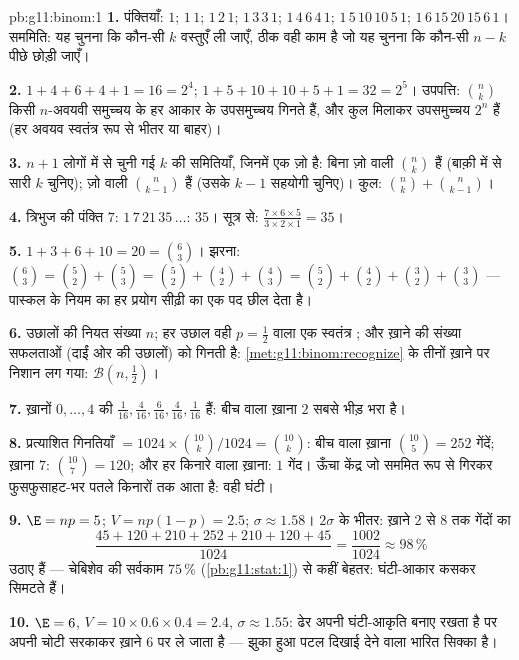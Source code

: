 \begin{solution}{pb:g11:binom:1}
\textbf{1.} पंक्तियाँ: $1$; $1\,1$; $1\,2\,1$; $1\,3\,3\,1$; $1\,4\,6\,4\,1$; $1\,5\,10\,10\,5\,1$; $1\,6\,15\,20\,15\,6\,1$। सममिति: यह
चुनना कि कौन-सी $k$ वस्तुएँ ली जाएँ, ठीक वही काम है जो यह चुनना कि कौन-सी
$n - k$ पीछे छोड़ी जाएँ।

\textbf{2.} $1 + 4 + 6 + 4 + 1 = 16 = 2^4$; $1 + 5 + 10 + 10 + 5 + 1 = 32 = 2^5$। उपपत्ति: $\binom nk$ किसी $n$-अवयवी समुच्चय के हर आकार के
उपसमुच्चय गिनते हैं, और कुल मिलाकर उपसमुच्चय $2^n$ हैं (हर अवयव स्वतंत्र रूप
से भीतर या बाहर)।

\textbf{3.} $n + 1$ लोगों में से चुनी गई $k$ की समितियाँ, जिनमें एक ज़ो है: बिना
ज़ो वाली $\binom nk$ हैं (बाक़ी में से सारी $k$ चुनिए); ज़ो वाली $\binom{n}{k-1}$ हैं (उसके
$k - 1$ सहयोगी चुनिए)। कुल: $\binom nk + \binom{n}{k-1}$।

\textbf{4.} त्रिभुज की पंक्ति $7$: $1\,7\,21\,35\,\dots$: $35$। सूत्र से: $\frac{7 \times 6 \times 5}{3 \times 2 \times 1} =
35$।

\textbf{5.} $1 + 3 + 6 + 10 = 20 = \binom63$। झरना: $\binom63 = \binom52 + \binom53 = \binom52 + \binom42 +
\binom43 = \binom52 + \binom42 + \binom32 + \binom33$ --- पास्कल के नियम का हर प्रयोग सीढ़ी का एक पद
छील देता है।

\textbf{6.} उछालों की नियत संख्या $n$; हर उछाल वही $p = \frac12$ वाला एक स्वतंत्र
; और ख़ाने की संख्या सफलताओं (दाईं ओर की उछालों) को गिनती है:
\cref{met:g11:binom:recognize} के तीनों ख़ाने पर निशान लग गया: $\mathcal B\!\left(n, \frac12\right)$।

\textbf{7.} ख़ानों $0, \dots, 4$ की  $\frac{1}{16}, \frac{4}{16},
\frac{6}{16}, \frac{4}{16}, \frac{1}{16}$ हैं: बीच वाला ख़ाना $2$ सबसे
भीड़ भरा है।

\textbf{8.} प्रत्याशित गिनतियाँ $= 1024 \times
\binom{10}{k}/1024 = \binom{10}{k}$: बीच वाला ख़ाना $\binom{10}{5} = 252$ गेंदें; ख़ाना
$7$: $\binom{10}{7} = 120$; और हर किनारे वाला ख़ाना: $1$ गेंद। ऊँचा केंद्र जो सममित रूप
से गिरकर फुसफुसाहट-भर पतले किनारों तक आता है: वही घंटी।

\textbf{9.} $\E = np = 5$; $V = np(1 - p) = 2.5$; $\sigma \approx 1.58$। $2\sigma$ के भीतर: ख़ाने $2$ से $8$ तक
गेंदों का \[
\frac{45 + 120 + 210 + 252 + 210 + 120 + 45}{1024}
= \frac{1002}{1024} \approx 98\,\%
\] उठाए हैं --- चेबिशेव की सर्वकाम $75\,\%$ (\cref{pb:g11:stat:1}) से कहीं बेहतर:
घंटी-आकार कसकर सिमटते हैं।

\textbf{10.} $\E = 6$, $V = 10 \times 0.6 \times 0.4 = 2.4$, $\sigma \approx 1.55$: ढेर अपनी घंटी-आकृति बनाए रखता है पर अपनी
चोटी सरकाकर ख़ाने $6$ पर ले जाता है --- झुका हुआ पटल दिखाई देने वाला
भारित सिक्का है।


\end{solution}
